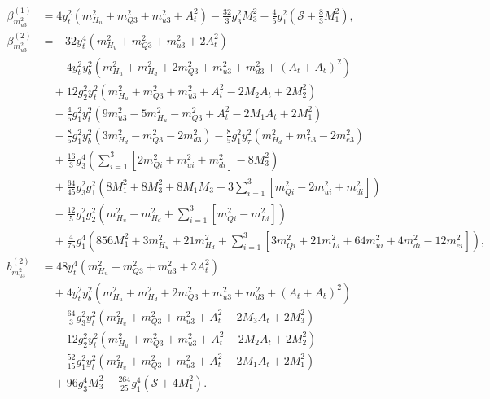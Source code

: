 \documentclass[preprint,amsmath,amssymb,aps,superscriptaddress,prd,showpacs,floatfix]{revtex4-1}
\begin{document}
\begin{subequations} \label{eq:MSSMmu32Betas}
\begin{align}
\beta_{m_{u3}^2}^{(1)}&=4y_t^2\left ( m_{H_u}^2+m_{Q3}^2+m_{u3}^2+A_t^2\right )-\frac{32}{3}g_3^2M_3^2-\frac{4}{5}g_1^2\left ( \mathcal{S}+\frac{8}{3}M_1^2\right ),\label{eq:MSSMmu32beta1}\\
\beta_{m_{u3}^2}^{(2)}&=-32y_t^4\left ( m_{H_u}^2+m_{Q3}^2+m_{u3}^2+2A_t^2\right )\nonumber\\
&\quad{}-4y_t^2y_b^2\left ( m_{H_u}^2+m_{H_d}^2+2m_{Q3}^2+m_{u3}^2+m_{d3}^2+(A_t+A_b)^2\right )\nonumber\\
&\quad{}+12g_2^2y_t^2\left ( m_{H_u}^2+m_{Q3}^2+m_{u3}^2+A_t^2-2M_2A_t+2M_2^2\right )\nonumber\\
&\quad{}-\frac{4}{5}g_1^2y_t^2\left ( 9m_{u3}^2-5m_{H_u}^2-m_{Q3}^2+A_t^2-2M_1A_t+2M_1^2\right )\nonumber\\
&\quad{}-\frac{8}{5}g_1^2y_b^2\left ( 3m_{H_d}^2-m_{Q3}^2-2m_{d3}^2\right )-\frac{8}{5}g_1^2y_\tau^2\left ( m_{H_d}^2+m_{L3}^2-2m_{e3}^2\right )\nonumber\\
&\quad{}+\frac{16}{3}g_3^4\left ( \sum_{i=1}^3\left [2m_{Qi}^2+m_{ui}^2+m_{di}^2 \right ]-8M_3^2\right )\nonumber\\
&\quad{}+\frac{64}{45}g_3^2g_1^2\left ( 8M_1^2+8M_3^2+8M_1M_3-3\sum_{i=1}^3\left [ m_{Qi}^2-2m_{ui}^2+m_{di}^2\right ]\right )\nonumber\\
&\quad{}-\frac{12}{5}g_1^2g_2^2\left ( m_{H_u}^2-m_{H_d}^2+\sum_{i=1}^3\left [ m_{Qi}^2-m_{Li}^2\right ]\right )\nonumber\\
&\quad{}+\frac{4}{75}g_1^4\left ( 856M_1^2+3m_{H_u}^2+21m_{H_d}^2+\sum_{i=1}^3\left [ 3m_{Qi}^2+21m_{Li}^2+64m_{ui}^2+4m_{di}^2-12m_{ei}^2\right ]\right ),\label{eq:MSSMmu32beta2}\\
b_{m_{u3}^2}^{(2)}&=48y_t^4\left ( m_{H_u}^2+m_{Q3}^2+m_{u3}^2+2A_t^2\right )\nonumber\\
&\quad{}+4y_t^2y_b^2\left ( m_{H_u}^2+m_{H_d}^2+2m_{Q3}^2+m_{u3}^2+m_{d3}^2+(A_t+A_b)^2\right )\nonumber\\
&\quad{}-\frac{64}{3}g_3^2y_t^2\left ( m_{H_u}^2+m_{Q3}^2+m_{u3}^2+A_t^2-2M_3A_t+2M_3^2\right )\nonumber\\
&\quad{}-12g_2^2y_t^2\left ( m_{H_u}^2+m_{Q3}^2+m_{u3}^2+A_t^2-2M_2A_t+2M_2^2\right )\nonumber\\
&\quad{}-\frac{52}{15}g_1^2y_t^2\left ( m_{H_u}^2+m_{Q3}^2+m_{u3}^2+A_t^2-2M_1A_t+2M_1^2\right )\nonumber\\
&\quad{}+96g_3^4M_3^2-\frac{264}{25}g_1^4\left ( \mathcal{S}+4M_1^2\right ).\label{eq:MSSMmu32b2}
\end{align}
\end{subequations}
\end{document}
